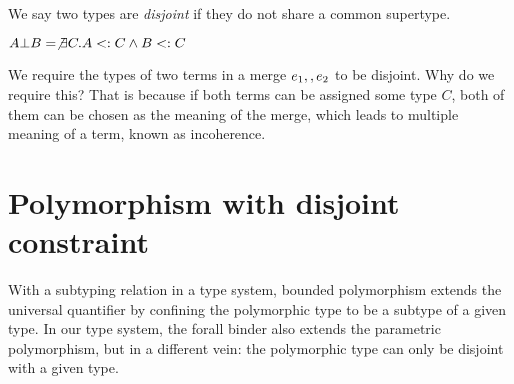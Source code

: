 \documentclass[nocopyrightspace,preprint,times,9pt]{sigplanconf}
\begin{document}

We say two types are \emph{disjoint} if they do not share a common supertype.

\begin{definition}[Disjointness]
$A \bot B = \not \exists C. A <: C \wedge B <: C$
\end{definition}

We require the types of two terms in a merge $e_1 ,, e_2$ to be disjoint. Why do we require this? That is because if both terms can be assigned some type $C$, both of them can be chosen as the meaning of the merge, which leads to multiple meaning of a term, known as incoherence.

%
%

\section{Polymorphism with disjoint constraint}

With a subtyping relation in a type system, bounded polymorphism extends the universal quantifier by confining the polymorphic type to be a subtype of a given type. In our type system, the forall binder also extends the parametric polymorphism, but in a different vein: the polymorphic type can only be disjoint with a given type.
\end{document}
